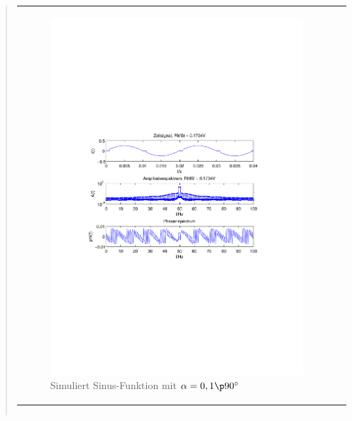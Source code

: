 \begin{quote}
\begin{center}
\begin{tabular}{ll}
            \begin{minipage}{0.6\textwidth}
                \begin{figure}[H]
                    \label{fig:pico_sin_f-50_a-00}
                    \includegraphics[scale=0.55, trim = 35mm 100mm 35mm 95mm, clip]{Bilder/sin_f-50_a-0,1}
                    \caption{Simuliert Sinus-Funktion mit $\alpha = 0,1 \p 90^\circ$}
                \end{figure}
        
            \end{minipage}
        
        \end{tabular}
        \end{center}




        \begin{center}
        \begin{tabular}{ll}
        

\end{tabular}
\end{center}
\end{quote}
